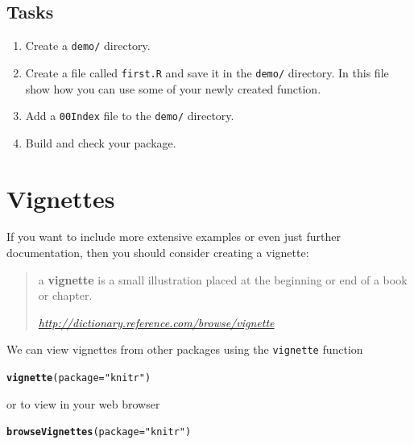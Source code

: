 \documentclass[a4paper,justified,openany]{tufte-handout}\usepackage[]{graphicx}\usepackage[]{color}
\makeatletter
\newcommand{\hlstr}[1]{\textcolor[rgb]{0.192,0.494,0.8}{#1}}%
\newcommand{\hlstd}[1]{\textcolor[rgb]{0.345,0.345,0.345}{#1}}%
\newcommand{\hlkwc}[1]{\textcolor[rgb]{0.333,0.667,0.333}{#1}}%
\newcommand{\hlkwd}[1]{\textcolor[rgb]{0.737,0.353,0.396}{\textbf{#1}}}%
\newenvironment{kframe}{%
 \def\at@end@of@kframe{}%
 \ifinner\ifhmode%
  \def\at@end@of@kframe{\end{minipage}}%
  \begin{minipage}{\columnwidth}%
 \fi\fi%
 \def\FrameCommand##1{\hskip\@totalleftmargin \hskip-\fboxsep
 \colorbox{shadecolor}{##1}\hskip-\fboxsep
     \hskip-\linewidth \hskip-\@totalleftmargin \hskip\columnwidth}%
 \MakeFramed {\advance\hsize-\width
   \@totalleftmargin\z@ \linewidth\hsize
   \@setminipage}}%
 {\par\unskip\endMakeFramed%
 \at@end@of@kframe}
\newenvironment{knitrout}{}{} %
\newcommand{\cc}{\texttt}
\makeatother
\begin{document}
\subsection{Tasks}

\begin{enumerate}
\item Create a \cc{demo/} directory.
\item Create a file called \cc{first.R} and save it in the \cc{demo/} directory.
  In this file show how you can use some of your newly created function.
\item Add a \cc{00Index} file to the \cc{demo/} directory.
\item Build and check your package.
\end{enumerate}

\newpage
\section{Vignettes}

If you want to include more extensive examples or even just further
documentation, then you should consider creating a vignette:
\begin{quote}
  a \textbf{vignette} is a small illustration placed at the beginning or end of
  a book or chapter.

  \em \url{http://dictionary.reference.com/browse/vignette}
\end{quote}
We can view vignettes from other packages using the \cc{vignette} function

\begin{knitrout}
\color{fgcolor}\begin{kframe}
\begin{alltt}
\hlkwd{vignette}\hlstd{(}\hlkwc{package}\hlstd{=}\hlstr{"knitr"}\hlstd{)}
\end{alltt}
\end{kframe}
\end{knitrout}
\noindent or to view in your web browser

\begin{knitrout}
\color{fgcolor}\begin{kframe}
\begin{alltt}
\hlkwd{browseVignettes}\hlstd{(}\hlkwc{package}\hlstd{=}\hlstr{"knitr"}\hlstd{)}
\end{alltt}
\end{kframe}
\end{knitrout}
\end{document}
